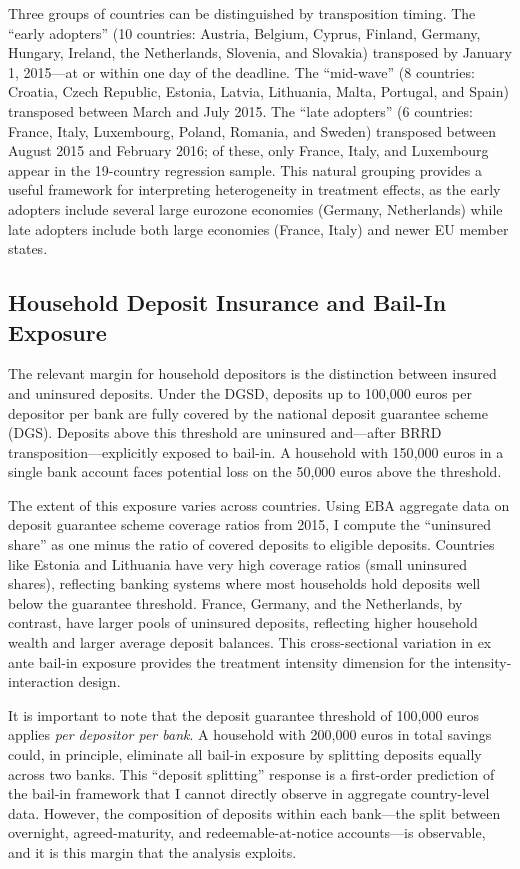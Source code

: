 \documentclass[12pt]{article}
\begin{document}
Three groups of countries can be distinguished by transposition timing. The ``early adopters'' (10 countries: Austria, Belgium, Cyprus, Finland, Germany, Hungary, Ireland, the Netherlands, Slovenia, and Slovakia) transposed by January 1, 2015---at or within one day of the deadline. The ``mid-wave'' (8 countries: Croatia, Czech Republic, Estonia, Latvia, Lithuania, Malta, Portugal, and Spain) transposed between March and July 2015. The ``late adopters'' (6 countries: France, Italy, Luxembourg, Poland, Romania, and Sweden) transposed between August 2015 and February 2016; of these, only France, Italy, and Luxembourg appear in the 19-country regression sample. This natural grouping provides a useful framework for interpreting heterogeneity in treatment effects, as the early adopters include several large eurozone economies (Germany, Netherlands) while late adopters include both large economies (France, Italy) and newer EU member states.

\subsection{Household Deposit Insurance and Bail-In Exposure}

The relevant margin for household depositors is the distinction between insured and uninsured deposits. Under the DGSD, deposits up to 100{,}000 euros per depositor per bank are fully covered by the national deposit guarantee scheme (DGS). Deposits above this threshold are uninsured and---after BRRD transposition---explicitly exposed to bail-in. A household with 150{,}000 euros in a single bank account faces potential loss on the 50{,}000 euros above the threshold.

The extent of this exposure varies across countries. Using EBA aggregate data on deposit guarantee scheme coverage ratios from 2015, I compute the ``uninsured share'' as one minus the ratio of covered deposits to eligible deposits. Countries like Estonia and Lithuania have very high coverage ratios (small uninsured shares), reflecting banking systems where most households hold deposits well below the guarantee threshold. France, Germany, and the Netherlands, by contrast, have larger pools of uninsured deposits, reflecting higher household wealth and larger average deposit balances. This cross-sectional variation in ex ante bail-in exposure provides the treatment intensity dimension for the intensity-interaction design.

It is important to note that the deposit guarantee threshold of 100{,}000 euros applies \textit{per depositor per bank}. A household with 200{,}000 euros in total savings could, in principle, eliminate all bail-in exposure by splitting deposits equally across two banks. This ``deposit splitting'' response is a first-order prediction of the bail-in framework that I cannot directly observe in aggregate country-level data. However, the composition of deposits within each bank---the split between overnight, agreed-maturity, and redeemable-at-notice accounts---is observable, and it is this margin that the analysis exploits.
\end{document}
